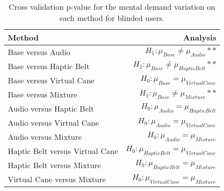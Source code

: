 
\begin{table}[!htb]
\centering
\caption{Cross validation p-value for the mental demand variation on each method for blinded users.}
\label{tab:lsd_mental_demand_var}
\begin{tabular}{lr}
\toprule
                         Method &                                       Analysis \\
\midrule
              Base versus Audio &           $H_1 : \mu_{Base} \ne \mu_{Audio}**$ \\
        Base versus Haptic Belt &     $H_1 : \mu_{Base} \ne \mu_{Haptic Belt}**$ \\
       Base versus Virtual Cane &        $H_0 : \mu_{Base} = \mu_{Virtual Cane}$ \\
            Base versus Mixture &         $H_1 : \mu_{Base} \ne \mu_{Mixture}**$ \\
       Audio versus Haptic Belt &        $H_0 : \mu_{Audio} = \mu_{Haptic Belt}$ \\
      Audio versus Virtual Cane &       $H_0 : \mu_{Audio} = \mu_{Virtual Cane}$ \\
           Audio versus Mixture &            $H_0 : \mu_{Audio} = \mu_{Mixture}$ \\
Haptic Belt versus Virtual Cane & $H_0 : \mu_{Haptic Belt} = \mu_{Virtual Cane}$ \\
     Haptic Belt versus Mixture &      $H_0 : \mu_{Haptic Belt} = \mu_{Mixture}$ \\
    Virtual Cane versus Mixture &     $H_0 : \mu_{Virtual Cane} = \mu_{Mixture}$ \\
\bottomrule
\end{tabular}
\end{table}

